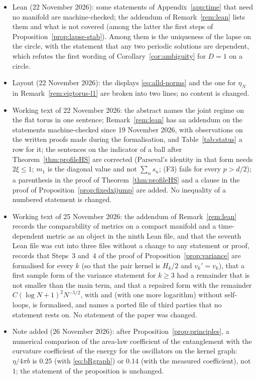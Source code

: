 \documentclass[11pt,a4paper]{article}
\theoremstyle{stmt}
\theoremstyle{defn}
\theoremstyle{rmk}
\numberwithin{equation}{section}
\begin{document}
\begin{itemize}
\item Lean (22 November 2026): some statements of Appendix~\ref{app:time} that need no manifold are machine-checked; the addendum of Remark~\ref{rem:lean} lists them and what is not covered (among the latter the first steps of Proposition~\ref{prop:lapse-stab}). Among them is the uniqueness of the lapse on the circle, with the statement that any two periodic solutions are dependent, which refutes the first wording of Corollary~\ref{cor:ambiguity} for $D=1$ on a circle.
\item Layout (22 November 2026): the displays \eqref{eq:alld-norms} and the one for $\eta_N$ in Remark~\ref{rem:eigtorus-l1} are broken into two lines; no content is changed.
\item Working text of 22 November 2026: the abstract names the joint regime on the flat torus in one sentence; Remark~\ref{rem:lean} has an addendum on the statements machine-checked since 19 November 2026, with observations on the written proofs made during the formalisation, and Table~\ref{tab:status} a row for it; the sentences on the indicator of a ball after Theorem~\ref{thm:profileHS} are corrected (Parseval's identity in that form needs $2\xi\le1$; $m_1$ is the diagonal value and not $\sum_ns_n$; (F3) fails for every $p>d/2$); a parenthesis in the proof of Theorem~\ref{thm:profileHS} and a clause in the proof of Proposition~\ref{prop:fixedxijump} are added. No inequality of a numbered statement is changed.
\item Working text of 25 November 2026: the addendum of Remark~\ref{rem:lean} records the comparability of metrics on a compact manifold and a time-dependent metric as an object in the ninth Lean file, and that the seventh Lean file was cut into three files without a change to any statement or proof, records that Steps~3 and~4 of the proof of Proposition~\ref{prop:variance} are formalised for every $k$ (so that the pair kernel is $H_k/2$ and $v_k'=v_k$), that a first sample form of the variance statement for $k\ge3$ had a remainder that is not smaller than the main term, and that a repaired form with the remainder $C(\log N+1)^2N^{-5/2}$, with and (with one more logarithm) without self-loops, is formalised, and names a ported file of third parties that no statement rests on. No statement of the paper was changed.
\item Note added (26 November 2026): after Proposition~\ref{prop:principles}, a numerical comparison of the area-law coefficient of the entanglement with the curvature coefficient of the energy for the oscillators on the kernel graph: $\eta/4\pi b$ is $0.25$ (with \eqref{eq:bRgraph}) or $0.14$ (with the measured coefficient), not $1$; the statement of the proposition is unchanged.

\end{itemize}
\end{document}
